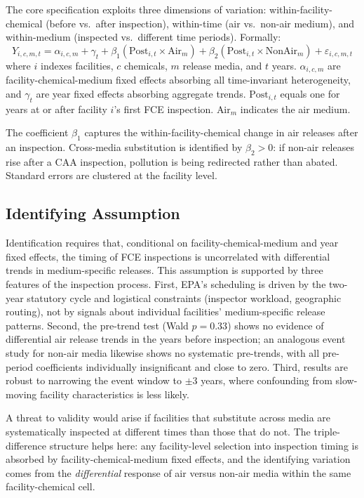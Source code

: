 \documentclass[12pt]{article}
\begin{document}
The core specification exploits three dimensions of variation: within-facility-chemical (before vs.\ after inspection), within-time (air vs.\ non-air medium), and within-medium (inspected vs.\ different time periods). Formally:
\begin{equation}
\label{eq:main}
Y_{i,c,m,t} = \alpha_{i,c,m} + \gamma_t + \beta_1 (\text{Post}_{i,t} \times \text{Air}_m) + \beta_2 (\text{Post}_{i,t} \times \text{NonAir}_m) + \varepsilon_{i,c,m,t}
\end{equation}
where $i$ indexes facilities, $c$ chemicals, $m$ release media, and $t$ years. $\alpha_{i,c,m}$ are facility-chemical-medium fixed effects absorbing all time-invariant heterogeneity, and $\gamma_t$ are year fixed effects absorbing aggregate trends. $\text{Post}_{i,t}$ equals one for years at or after facility $i$'s first FCE inspection. $\text{Air}_m$ indicates the air medium.

The coefficient $\beta_1$ captures the within-facility-chemical change in air releases after an inspection. Cross-media substitution is identified by $\beta_2 > 0$: if non-air releases rise after a CAA inspection, pollution is being redirected rather than abated. Standard errors are clustered at the facility level.

\subsection{Identifying Assumption}

Identification requires that, conditional on facility-chemical-medium and year fixed effects, the timing of FCE inspections is uncorrelated with differential trends in medium-specific releases. This assumption is supported by three features of the inspection process. First, EPA's scheduling is driven by the two-year statutory cycle and logistical constraints (inspector workload, geographic routing), not by signals about individual facilities' medium-specific release patterns. Second, the pre-trend test (Wald $p = 0.33$) shows no evidence of differential air release trends in the years before inspection; an analogous event study for non-air media likewise shows no systematic pre-trends, with all pre-period coefficients individually insignificant and close to zero. Third, results are robust to narrowing the event window to $\pm 3$ years, where confounding from slow-moving facility characteristics is less likely.

A threat to validity would arise if facilities that substitute across media are systematically inspected at different times than those that do not. The triple-difference structure helps here: any facility-level selection into inspection timing is absorbed by facility-chemical-medium fixed effects, and the identifying variation comes from the \textit{differential} response of air versus non-air media within the same facility-chemical cell.
\end{document}
